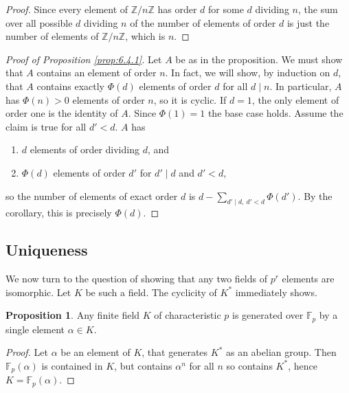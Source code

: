 \documentclass{article}
\newcommand{\F}{\mathbb{F}}
\newcommand{\Z}{\mathbb{Z}}
\newcommand{\rb}[1]{\left( #1 \right)}
\theoremstyle{definition}\newtheorem{definition}{Definition}[subsection]
\theoremstyle{definition}\newtheorem{remark}[definition]{Remark}
\theoremstyle{definition}\newtheorem*{example}{Example}
\theoremstyle{definition}\newtheorem*{note}{Note}
\newtheorem{proposition}[definition]{Proposition}
\begin{document}
\begin{proof}
Since every element of $ \Z / n\Z $ has order $ d $ for some $ d $ dividing $ n $, the sum over all possible $ d $ dividing $ n $ of the number of elements of order $ d $ is just the number of elements of $ \Z / n\Z $, which is $ n $.
\end{proof}

\begin{proof}[Proof of Proposition \ref{prop:6.4.1}]
Let $ A $ be as in the proposition. We must show that $ A $ contains an element of order $ n $. In fact, we will show, by induction on $ d $, that $ A $ contains exactly $ \Phi\rb{d} $ elements of order $ d $ for all $ d \mid n $. In particular, $ A $ has $ \Phi\rb{n} > 0 $ elements of order $ n $, so it is cyclic. If $ d = 1 $, the only element of order one is the identity of $ A $. Since $ \Phi\rb{1} = 1 $ the base case holds. Assume the claim is true for all $ d' < d $. $ A $ has
\begin{enumerate}
\item $ d $ elements of order dividing $ d $, and
\item $ \Phi\rb{d} $ elements of order $ d' $ for $ d' \mid d $ and $ d' < d $,
\end{enumerate}
so the number of elements of exact order $ d $ is $ d - \sum_{d' \mid d, \ d' < d} \Phi\rb{d'} $. By the corollary, this is precisely $ \Phi\rb{d} $.
\end{proof}

\subsection{Uniqueness}

We now turn to the question of showing that any two fields of $ p^r $ elements are isomorphic. Let $ K $ be such a field. The cyclicity of $ K^* $ immediately shows.

\begin{proposition}
Any finite field $ K $ of characteristic $ p $ is generated over $ \F_p $ by a single element $ \alpha \in K $.
\end{proposition}

\begin{proof}
Let $ \alpha $ be an element of $ K $, that generates $ K^* $ as an abelian group. Then $ \F_p\rb{\alpha} $ is contained in $ K $, but contains $ \alpha^n $ for all $ n $ so contains $ K^* $, hence $ K = \F_p\rb{\alpha} $.
\end{proof}
\end{document}
